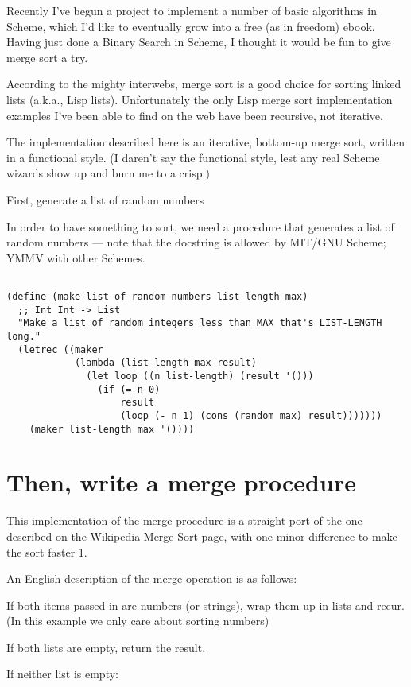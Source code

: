\documentclass[12pt,openright,draft]{book}
\begin{document}
Recently I've begun a project to implement a number of basic algorithms in Scheme, which I'd like to eventually grow into a free (as in freedom) ebook. Having just done a Binary Search in Scheme, I thought it would be fun to give merge sort a try.

According to the mighty interwebs, merge sort is a good choice for sorting linked lists (a.k.a., Lisp lists). Unfortunately the only Lisp merge sort implementation examples I've been able to find on the web have been recursive, not iterative.

The implementation described here is an iterative, bottom-up merge sort, written in a functional style. (I daren't say the functional style, lest any real Scheme wizards show up and burn me to a crisp.)

First, generate a list of random numbers

In order to have something to sort, we need a procedure that generates a list of random numbers --- note that the docstring is allowed by MIT/GNU Scheme; YMMV with other Schemes.

\begin{verbatim}

(define (make-list-of-random-numbers list-length max)
  ;; Int Int -> List
  "Make a list of random integers less than MAX that's LIST-LENGTH long."
  (letrec ((maker
            (lambda (list-length max result)
              (let loop ((n list-length) (result '()))
                (if (= n 0)
                    result
                    (loop (- n 1) (cons (random max) result)))))))
    (maker list-length max '())))

\end{verbatim}

\section{Then, write a merge procedure}

This implementation of the merge procedure is a straight port of the one described on the Wikipedia Merge Sort page, with one minor difference to make the sort faster 1.

An English description of the merge operation is as follows:

If both items passed in are numbers (or strings), wrap them up in lists and recur. (In this example we only care about sorting numbers)

If both lists are empty, return the result.

If neither list is empty:
\end{document}
